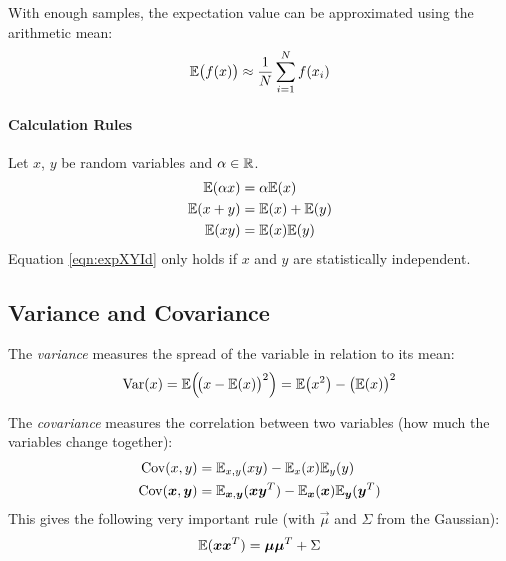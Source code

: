 			With enough samples, the expectation value can be approximated using the arithmetic mean:
			\begin{equation}
				\mathbb{E}\big(f(x)\big) \approx \frac{1}{N} \sum_{i = 1}^{N} f(x_i)
			\end{equation}

			\paragraph{Calculation Rules}
				Let \(x\), \(y\) be random variables and \(\alpha \in \mathbb{R}\).
				\begin{align}
					\mathbb{E}(\alpha x) &= \alpha \mathbb{E}(x) \\
					\mathbb{E}(x + y) &= \mathbb{E}(x) + \mathbb{E}(y) \\
					\mathbb{E}(xy) &= \mathbb{E}(x) \mathbb{E}(y) \label{eqn:expXYId}
				\end{align}
				Equation \ref{eqn:expXYId} only holds if \(x\) and \(y\) are statistically independent.

		\subsection{Variance and Covariance}
			The \emph{variance} measures the spread of the variable in relation to its mean:
			\begin{equation}
				\operatorname{Var}(x) = \mathbb{E}\Big(\!\big( x - \mathbb{E}(x) \big)^2 \Big) = \mathbb{E}\big(x^2\big) - \big(\mathbb{E}(x)\big)^2
			\end{equation}

			The \emph{covariance} measures the correlation between two variables (how much the variables change together):
			\begin{align}
				\operatorname{Cov}(x, y) &= \mathbb{E}_{x,y}(xy) - \mathbb{E}_x(x) \mathbb{E}_y(y) \\
				\operatorname{Cov}(\bm{x}, \bm{y}) &= \mathbb{E}_{\bm{x},\bm{y}}(\bm{x}\bm{y}^T) - \mathbb{E}_{\bm{x}}(\bm{x}) \mathbb{E}_{\bm{y}}(\bm{y}^T)
			\end{align}
			This gives the following very important rule (with \(\vec{\mu}\) and \(\Sigma\) from the Gaussian):
			\begin{equation}
				\mathbb{E}(\bm{x}\bm{x}^T) = \bm{\mu}\bm{\mu}^T + \Sigma
			\end{equation}

